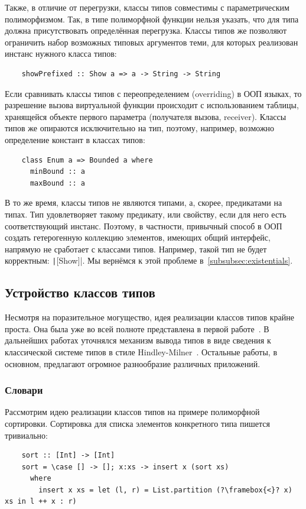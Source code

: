 Также, в отличие от перегрузки, классы типов совместимы с параметрическим полиморфизмом.
Так, в типе полиморфной функции нельзя указать, что для типа должна присутствовать определённая перегрузка.
Классы типов же позволяют ограничить набор возможных типовых аргументов теми, для которых реализован инстанс нужного класса типов:
\begin{verbatim}
    showPrefixed :: Show a => a -> String -> String
\end{verbatim}

Если сравнивать классы типов с переопределением (overriding) в ООП языках, то разрешение вызова виртуальной функции происходит с использованием таблицы, хранящейся объекте первого параметра (получателя вызова, receiver).
Классы типов же опираются исключительно на тип, поэтому, например, возможно определение констант в классах типов:
\begin{verbatim}
    class Enum a => Bounded a where
      minBound :: a
      maxBound :: a
\end{verbatim}

В то же время, классы типов не являются типами, а, скорее, предикатами на типах.
Тип удовлетворяет такому предикату, или свойству, если для него есть соответствующий инстанс.
Поэтому, в частности, привычный способ в ООП создать гетерогенную коллекцию элементов, имеющих общий интерфейс, напрямую не сработает с классами типов.
Например, такой тип не будет корректным: \texttt|[Show]|.
Мы вернёмся к этой проблеме в~\ref{subsubsec:existentials}.

\subsection{Устройство классов типов}

Несмотря на поразительное могущество, идея реализации классов типов крайне проста.
Она была уже во всей полноте представлена в первой работе~\cite{wadler1989make}.
В дальнейших работах уточнялся механизм вывода типов в виде сведения к классической системе типов в стиле Hindley-Milner~\cite{hall1996type}.
Остальные работы, в основном, предлагают огромное разнообразие различных приложений.

\subsubsection{Словари}

Рассмотрим идею реализации классов типов на примере полиморфной сортировки.
Сортировка для списка элементов конкретного типа пишется тривиально:
\begin{verbatim}
    sort :: [Int] -> [Int]
    sort = \case [] -> []; x:xs -> insert x (sort xs)
      where
        insert x xs = let (l, r) = List.partition (?\framebox{<}? x) xs in l ++ x : r)
\end{verbatim}

